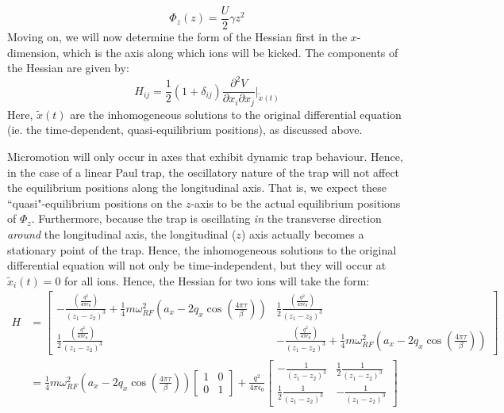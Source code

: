 \documentclass{article}
\begin{document}
\begin{equation}
\Phi_z (z) = \frac{U}{2} \gamma z^2	
\end{equation}
Moving on, we will now determine the form of the Hessian first in the $x$-dimension, which is the axis along which ions will be kicked. The components of the Hessian are given by:
\begin{equation}
H_{ij} = \frac{1}{2} (1 + \delta_{ij}) \frac{\partial^2 V}{\partial x_i \partial x_j } \Biggr|_{\tilde{x} (t)}
\end{equation}
Here, $\tilde{x} (t)$ are the inhomogeneous solutions to the original differential equation (ie. the time-dependent, quasi-equilibrium positions), as discussed above. \par
\medskip
\noindent Micromotion will only occur in axes that exhibit dynamic trap behaviour. Hence, in the case of a linear Paul trap, the oscillatory nature of the trap will not affect the equilibrium positions along the longitudinal axis. That is, we expect these ``quasi"-equilibrium positions on the $z$-axis to be the actual equilibrium positions of $\Phi_z$. Furthermore, because the trap is oscillating \textit{in} the transverse direction \textit{around} the longitudinal axis, the longitudinal ($z$) axis actually becomes a stationary point of the trap. Hence, the inhomogeneous solutions to the original differential equation will not only be time-independent, but they will occur at $\tilde{x}_i (t) = 0$ for all ions. Hence, the Hessian for two ions will take the form:
\begin{align}
H & = \begin{bmatrix} -\frac{\left( \frac{q^2}{4 \pi \epsilon_0} \right)}{(z_1 - z_2)^3} + \frac{1}{4} m \omega_{RF}^2 \left( a_x - 2 q_x \cos(\frac{4 \pi \tau}{\beta}) \right) & \frac{1}{2} \frac{\left( \frac{q^2}{4 \pi \epsilon_0} \right)}{(z_1 - z_2)^3} \\ \frac{1}{2} \frac{\left( \frac{q^2}{4 \pi \epsilon_0} \right)}{(z_1 - z_2)^3} & -\frac{\left( \frac{q^2}{4 \pi \epsilon_0} \right)}{(z_1 - z_2)^3} + \frac{1}{4} m \omega_{RF}^2 \left(a_x - 2 q_x \cos(\frac{4 \pi \tau}{\beta}) \right) \end{bmatrix} \\
& = \frac{1}{4} m \omega_{RF}^2 \left( a_x - 2 q_x \cos(\frac{4 \pi \tau}{\beta}) \right) \begin{bmatrix} 1 & 0 \\ 0 & 1 \end{bmatrix} +  \frac{q^2}{4 \pi \epsilon_0} \begin{bmatrix} - \frac{1}{(z_1 - z_2)^3} & \frac{1}{2} \frac{1}{(z_1 - z_2)^3} \\ \frac{1}{2} \frac{1}{(z_1 - z_2)^3} & - \frac{1}{(z_1 - z_2)^3} \end{bmatrix}
\end{align}
\end{document}
